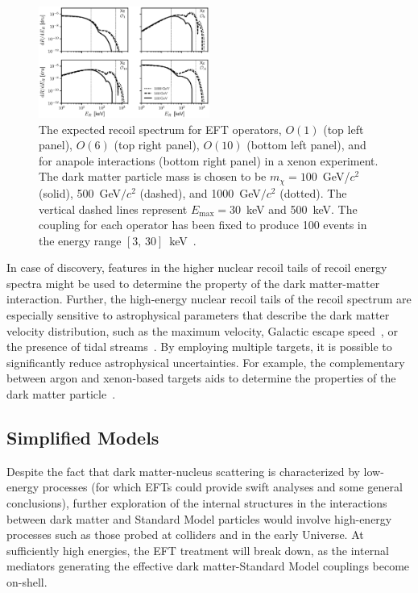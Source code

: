\begin{figure}[!htbp]
\centering
\includegraphics[width=0.5\textwidth]{fig_high_nr_difrates.eps}
\caption{The expected recoil spectrum for EFT operators, $O(1)$ (top left panel), $O(6)$ (top right panel), $O(10)$ (bottom left panel), and for anapole interactions (bottom right panel) in a xenon experiment. The dark matter particle mass is chosen to be $m_{\chi}=100$~GeV/$c^2$ (solid), 500~GeV$/c^2$ (dashed), and 1000~GeV$/c^2$ (dotted). The vertical dashed lines represent $E_{\mathrm{max}}=30$~keV and 500~keV. The coupling for each operator has been fixed to produce 100 events in the energy range $[3,\,30]$~keV~\cite{Bozorgnia:2018jep}.}
\label{fig:high_nr_spectra}
\end{figure}

In case of discovery, features in the higher nuclear recoil tails of recoil energy spectra might be used to determine the property of the dark matter-matter interaction. Further, the high-energy nuclear recoil tails of the recoil spectrum are especially sensitive to astrophysical parameters that describe the dark matter velocity distribution, such as the maximum velocity, Galactic escape speed~\cite{McCabe:2010zh,Wu:2019nhd}, or the presence of tidal streams~\cite{OHare:2018trr,OHare:2019qxc,Adhikari:2020gxw}. By employing multiple targets, it is possible to significantly reduce astrophysical uncertainties. For example, the complementary between argon and xenon-based targets aids to determine the properties of the dark matter particle~\cite{Bertone:2007xj, Pato:2010zk, Cerdeno:2013gqa, Peter:2013aha, Edwards:2018lsl}.

\subsection{Simplified Models} 

Despite the fact that dark matter-nucleus scattering is characterized by low-energy processes (for which EFTs could provide swift analyses and some general conclusions), further exploration of the internal structures in the interactions between dark matter and Standard Model particles would involve high-energy processes such as those probed at colliders and in the early Universe. At sufficiently high energies, the EFT treatment will break down, as the internal mediators generating the effective dark matter-Standard Model couplings become on-shell.

